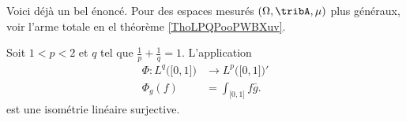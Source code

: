 Voici déjà un bel énoncé. Pour des espaces mesurés \( (\Omega,\tribA,\mu)\) plus généraux, voir l'arme totale en el théorème \ref{ThoLPQPooPWBXuv}.

\begin{proposition} \label{PropOAVooYZSodR}
    Soit \( 1<p<2\) et \( q\) tel que \( \frac{1}{ p }+\frac{1}{ q }=1\). L'application
    \begin{equation}
        \begin{aligned}
            \Phi\colon L^q\big( \mathopen[ 0 , 1 \mathclose] \big)&\to  L^p\big( \mathopen[ 0 , 1 \mathclose] \big)'  \\
            \Phi_g(f)&= \int_{\mathopen[ 0 , 1 \mathclose]}f\bar g.
        \end{aligned}
    \end{equation}
    est une isométrie linéaire surjective.
\end{proposition}


